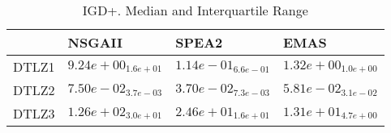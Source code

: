\documentclass{article}
\begin{document}
\begin{table}
\caption{IGD+. Median and Interquartile Range}
\label{table: IGD+}
\centering
\begin{scriptsize}
\begin{tabular}{llll}
\hline & NSGAII & SPEA2 &  EMAS\\
\hline 
DTLZ1 & $  9.24e+00_{ 1.6e+01}$ & \cellcolor{gray95}$  1.14e-01_{ 6.6e-01}$ & \cellcolor{gray25}$  1.32e+00_{ 1.0e+00}$ \\
DTLZ2 & $  7.50e-02_{ 3.7e-03}$ & \cellcolor{gray95}$  3.70e-02_{ 7.3e-03}$ & \cellcolor{gray25}$  5.81e-02_{ 3.1e-02}$ \\
DTLZ3 & $  1.26e+02_{ 3.0e+01}$ & \cellcolor{gray25}$  2.46e+01_{ 1.6e+01}$ & \cellcolor{gray95}$  1.31e+01_{ 4.7e+00}$ \\
\hline
\end{tabular}
\end{scriptsize}
\end{table}
\end{document}
